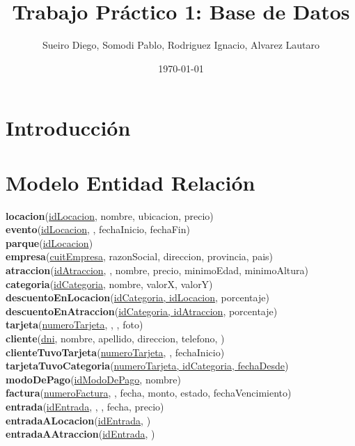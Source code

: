 \documentclass[onecolumn,10pt]{article}
\begin{document}
\title{Trabajo Práctico 1: Base de Datos}

\author{Sueiro Diego, Somodi Pablo, Rodriguez Ignacio, Alvarez Lautaro}

\date{\today}

\maketitle


\newpage

\tableofcontents

\newpage

\section{Introducción}

\newpage

\section{Modelo Entidad Relación}

\textbf{locacion}(\underline{idLocacion}, nombre, ubicacion, precio) \\
\textbf{evento}(\underline{idLocacion}, , fechaInicio, fechaFin) \\
\textbf{parque}(\underline{idLocacion}) \\
\textbf{empresa}(\underline{cuitEmpresa}, razonSocial, direccion, provincia, pais) \\
\textbf{atraccion}(\underline{idAtraccion}, , nombre, precio, minimoEdad, minimoAltura) \\
\textbf{categoria}(\underline{idCategoria}, nombre, valorX, valorY) \\
\textbf{descuentoEnLocacion}(\underline{idCategoria, idLocacion}, porcentaje) \\
\textbf{descuentoEnAtraccion}(\underline{idCategoria, idAtraccion}, porcentaje) \\
\textbf{tarjeta}(\underline{numeroTarjeta}, , , foto) \\
\textbf{cliente}(\underline{dni}, nombre, apellido, direccion, telefono, ) \\
\textbf{clienteTuvoTarjeta}(\underline{numeroTarjeta}, , fechaInicio) \\
\textbf{tarjetaTuvoCategoria}(\underline{numeroTarjeta, idCategoria, fechaDesde}) \\
\textbf{modoDePago}(\underline{idModoDePago}, nombre) \\
\textbf{factura}(\underline{numeroFactura}, , fecha, monto, estado, fechaVencimiento) \\
\textbf{entrada}(\underline{idEntrada}, , , fecha, precio) \\
\textbf{entradaALocacion}(\underline{idEntrada}, ) \\
\textbf{entradaAAtraccion}(\underline{idEntrada}, ) \\
\end{document}
